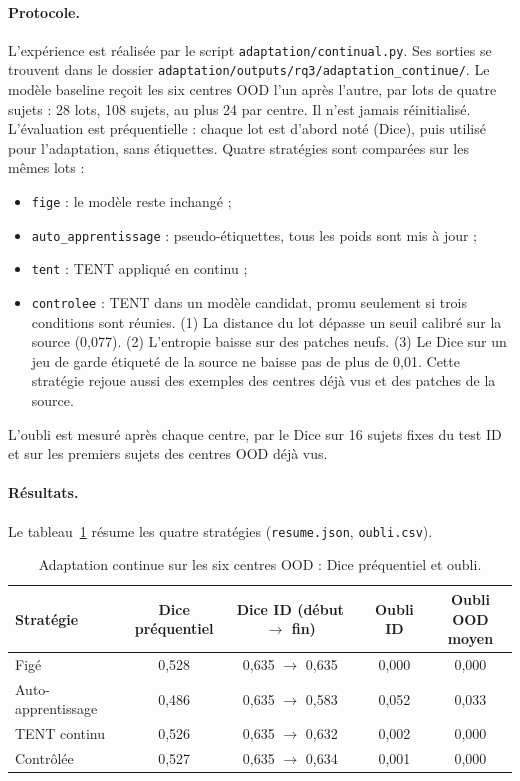 \paragraph{Protocole.}
L'expérience est réalisée par le script \nolinkurl{adaptation/continual.py}.
Ses sorties se trouvent dans le dossier \nolinkurl{adaptation/outputs/rq3/adaptation_continue/}.
Le modèle baseline reçoit les six centres OOD l'un après l'autre, par lots de quatre sujets : 28 lots, 108 sujets, au plus 24 par centre. Il n'est jamais réinitialisé.
L'évaluation est préquentielle : chaque lot est d'abord noté (Dice), puis utilisé pour l'adaptation, sans étiquettes.
Quatre stratégies sont comparées sur les mêmes lots :
\begin{itemize}
  \item \texttt{fige} : le modèle reste inchangé ;
  \item \texttt{auto\_apprentissage} : pseudo-étiquettes, tous les poids sont mis à jour ;
  \item \texttt{tent} : TENT appliqué en continu ;
  \item \texttt{controlee} : TENT dans un modèle candidat, promu seulement si trois conditions sont réunies. (1) La distance du lot dépasse un seuil calibré sur la source (0,077). (2) L'entropie baisse sur des patches neufs. (3) Le Dice sur un jeu de garde étiqueté de la source ne baisse pas de plus de 0,01. Cette stratégie rejoue aussi des exemples des centres déjà vus et des patches de la source.
\end{itemize}
L'oubli est mesuré après chaque centre, par le Dice sur 16 sujets fixes du test ID et sur les premiers sujets des centres OOD déjà vus.

\paragraph{Résultats.}
Le tableau~\ref{tab:rq3-continue} résume les quatre stratégies (\nolinkurl{resume.json}, \nolinkurl{oubli.csv}).

\begin{table}[htbp]
  \centering
  \caption{Adaptation continue sur les six centres OOD : Dice préquentiel et oubli.}
  \label{tab:rq3-continue}
  \small
  \begin{tabular}{lcccc}
    \toprule
    Stratégie & \makecell{Dice\\préquentiel} & \makecell{Dice ID\\(début $\rightarrow$ fin)} & Oubli ID & \makecell{Oubli OOD\\moyen} \\
    \midrule
    Figé & 0,528 & 0,635 $\rightarrow$ 0,635 & 0,000 & 0,000 \\
    Auto-apprentissage & 0,486 & 0,635 $\rightarrow$ 0,583 & 0,052 & 0,033 \\
    TENT continu & 0,526 & 0,635 $\rightarrow$ 0,632 & 0,002 & 0,000 \\
    Contrôlée & 0,527 & 0,635 $\rightarrow$ 0,634 & 0,001 & 0,000 \\
    \bottomrule
  \end{tabular}
\end{table}

